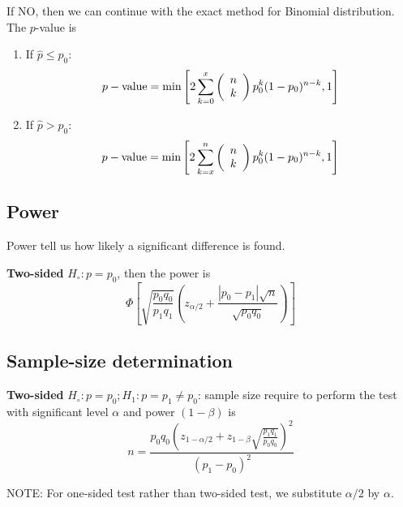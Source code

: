 If NO, then we can continue with the exact method for Binomial
distribution.
The $p$-value is
\begin{enumerate}
\item If $\hat{p} \le p_0$: 
  \begin{equation*}
   p-\text{value}= \min\left[ 2\sum^x_{k=0}\left(
      \begin{array}{c}
        n \\k
      \end{array}
    \right) p_0^k (1-p_0)^{n-k},1 \right]
  \end{equation*}


\item If $\hat{p} > p_0$:
  \begin{equation*}
    p-\text{value}= \min\left[ 2\sum^n_{k=x}\left(
        \begin{array}{c}
          n \\k
        \end{array}
      \right) p_0^k (1-p_0)^{n-k},1 \right]
  \end{equation*}
\end{enumerate}

\subsection{Power}
\label{sec:power}

Power tell us how likely a significant difference is found.

{\bf Two-sided} $H_\circ: p = p_0$, then the power is
\begin{equation}
  \label{eq:78}
  \Phi\left[ \sqrt{\frac{p_0q_0}{p_1q_1}}\left( z_{\alpha/2}+\frac{|p_0-p_1|\sqrt{n}}{\sqrt{p_0q_0}}\right)\right]
\end{equation}

\subsection{Sample-size determination}
\label{sec:sample-size-determ-1}

{\bf Two-sided} $H_\circ: p=p_0; H_1: p = p_1 \ne p_0$: sample size
require to perform the test with significant level $\alpha$ and power
$(1-\beta)$ is
\begin{equation}
  \label{eq:79}
  n = \frac{p_0q_0(z_{1-\alpha/2}+z_{1-\beta}\sqrt{\frac{p_1q_1}{p_0q_0}})^2}{(p_1-p_0)^2}
\end{equation}

NOTE: For one-sided test rather than two-sided test, we substitute
$\alpha/2$ by $\alpha$. 

